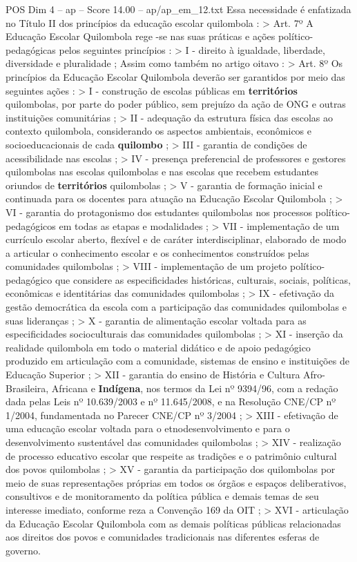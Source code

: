 \begin{textsample}{POS Dim 4 – ap – Score 14.00 – ap/ap\_em\_12.txt}
Essa necessidade é enfatizada no Título II dos princípios da educação escolar quilombola : > Art. 7º A Educação Escolar Quilombola rege -se nas suas práticas e ações político-pedagógicas pelos seguintes princípios : > I - direito à igualdade, liberdade, diversidade e pluralidade ; Assim como também no artigo oitavo : > Art. 8º Os princípios da Educação Escolar Quilombola deverão ser garantidos por meio das seguintes ações : > I - construção de escolas públicas em \textbf{territórios} quilombolas, por parte do poder público, sem prejuízo da ação de ONG e outras instituições comunitárias ; > II - adequação da estrutura física das escolas ao contexto quilombola, considerando os aspectos ambientais, econômicos e socioeducacionais de cada \textbf{quilombo} ; > III - garantia de condições de acessibilidade nas escolas ; > IV - presença preferencial de professores e gestores quilombolas nas escolas quilombolas e nas escolas que recebem estudantes oriundos de \textbf{territórios} quilombolas ; > V - garantia de formação inicial e continuada para os docentes para atuação na Educação Escolar Quilombola ; > VI - garantia do protagonismo dos estudantes quilombolas nos processos político-pedagógicos em todas as etapas e modalidades ; > VII - implementação de um currículo escolar aberto, flexível e de caráter interdisciplinar, elaborado de modo a articular o conhecimento escolar e os conhecimentos construídos pelas comunidades quilombolas ; > VIII - implementação de um projeto político-pedagógico que considere as especificidades históricas, culturais, sociais, políticas, econômicas e identitárias das comunidades quilombolas ; > IX - efetivação da gestão democrática da escola com a participação das comunidades quilombolas e suas lideranças ; > X - garantia de alimentação escolar voltada para as especificidades socioculturais das comunidades quilombolas ; > XI - inserção da realidade quilombola em todo o material didático e de apoio pedagógico produzido em articulação com a comunidade, sistemas de ensino e instituições de Educação Superior ; > XII - garantia do ensino de História e Cultura Afro-Brasileira, Africana e \textbf{Indígena}, nos termos da Lei nº 9394/96, com a redação dada pelas Leis nº 10.639/2003 e nº 11.645/2008, e na Resolução CNE/CP nº 1/2004, fundamentada no Parecer CNE/CP nº 3/2004 ; > XIII - efetivação de uma educação escolar voltada para o etnodesenvolvimento e para o desenvolvimento sustentável das comunidades quilombolas ; > XIV - realização de processo educativo escolar que respeite as tradições e o patrimônio cultural dos povos quilombolas ; > XV - garantia da participação dos quilombolas por meio de suas representações próprias em todos os órgãos e espaços deliberativos, consultivos e de monitoramento da política pública e demais temas de seu interesse imediato, conforme reza a Convenção 169 da OIT ; > XVI - articulação da Educação Escolar Quilombola com as demais políticas públicas relacionadas aos direitos dos povos e comunidades tradicionais nas diferentes esferas de governo.

\end{textsample}
